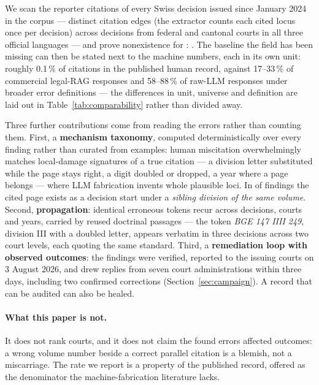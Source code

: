 \documentclass[11pt,a4paper]{article}
\newcommand{\RLetterDate}{3 August 2026}
\newcommand{\RNReplied}{seven}
\newcommand{\RNReplyDays}{three}
\begin{document}
We scan the reporter citations of every Swiss decision issued since
January 2024 in the corpus --- \NDenomTokens{} distinct citation edges
(the extractor counts each cited locus once per decision) across
\NWindowDecisions{} decisions from federal and cantonal courts in all
three official languages --- and prove nonexistence for \NFindings{}:
\RatePpm{}. The baseline the field has been missing can then be stated
next to the machine numbers, each in its own unit: roughly 0.1\,\% of
citations in the published human record, against 17--33\,\% of
commercial legal-RAG responses and 58--88\,\% of raw-LLM responses
under broader error definitions --- the differences in unit, universe
and definition are laid out in Table~\ref{tab:comparability} rather
than divided away.

Three further contributions come from reading the errors rather than
counting them. First, a \textbf{mechanism taxonomy}, computed
deterministically over every finding rather than curated from examples:
human miscitation overwhelmingly matches local-damage signatures of a
true citation --- a division letter substituted while the page stays
right, a digit doubled or dropped, a year where a page belongs ---
where LLM fabrication invents whole plausible loci. In \NMechDivision{} of
\NFindings{} findings the cited page exists as a decision start under a
\emph{sibling division of the same volume}. Second,
\textbf{propagation}: identical erroneous tokens recur across decisions,
courts and years, carried by reused doctrinal passages --- the token
\emph{BGE 147 IIII 249}, division III with a doubled letter, appears
verbatim in three decisions across two court levels, each quoting the
same standard. Third, a \textbf{remediation loop with observed
outcomes}: the findings were verified, reported to the issuing courts
on \RLetterDate{}, and drew replies from \RNReplied{} court
administrations within \RNReplyDays{} days, including two confirmed
corrections (Section~\ref{sec:campaign}). A record that can be audited can also be
healed.

\paragraph{What this paper is not.} It does not rank courts, and it
does not claim the found errors affected outcomes: a wrong volume
number beside a correct parallel citation is a blemish, not a
miscarriage. The rate we report is a property of the published record,
offered as the denominator the machine-fabrication literature lacks.
\end{document}
